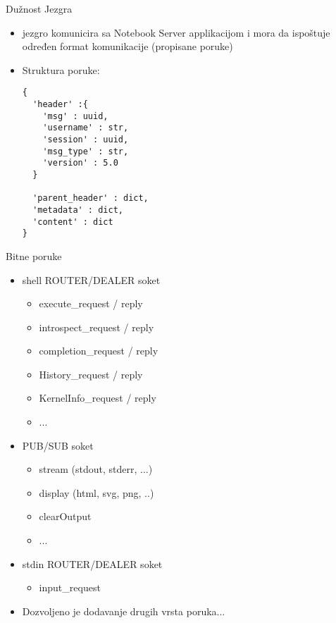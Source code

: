 \documentclass{beamer}
\begin{document}
\begin{frame}[fragile]{Dužnost Jezgra}
  \begin{itemize}
    \item {
        jezgro komunicira sa Notebook Server applikacijom i mora da ispoštuje
        određen format komunikacije (propisane poruke) \pause
      }
    \item{ Struktura poruke:
        \small
\begin{verbatim}
{
  'header' :{
    'msg' : uuid,
    'username' : str,
    'session' : uuid,
    'msg_type' : str,
    'version' : 5.0
  }

  'parent_header' : dict,
  'metadata' : dict,
  'content' : dict
}
\end{verbatim}
      }
  \end{itemize}
\end{frame}

\begin{frame}[fragile]{Bitne poruke}
  \begin{itemize}
    \item{ shell ROUTER/DEALER soket
        \begin{itemize}
          \item { execute\_request / reply }
          \item { introspect\_request / reply }
          \item { completion\_request / reply }
          \item { History\_request / reply }
          \item { KernelInfo\_request / reply }
          \item {...}
        \end{itemize}
      }

    \item{ PUB/SUB soket
        \begin{itemize}
          \item { stream (stdout, stderr, ...) }
          \item { display (html, svg, png, ..)}
          \item { clearOutput }
          \item { ... }
        \end{itemize}
      }

    \item{ stdin ROUTER/DEALER soket
        \begin{itemize}
          \item { input\_request }
        \end{itemize}
      }

    \item{ Dozvoljeno je dodavanje drugih vrsta poruka... }

  \end{itemize}
\end{frame}
\end{document}
